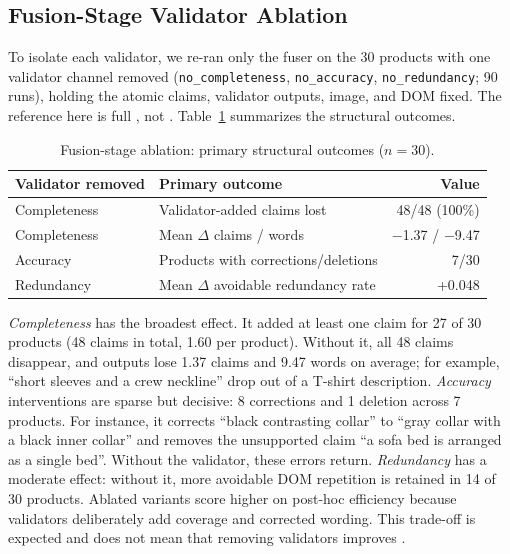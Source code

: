 \subsection{Fusion-Stage Validator Ablation}
To isolate each validator, we re-ran only the fuser on the 30 products with one validator channel removed (\texttt{no\_completeness}, \texttt{no\_accuracy}, \texttt{no\_redundancy}; 90 runs), holding the atomic claims, validator outputs, image, and DOM fixed. The reference here is full \sys, not \base. Table~\ref{tab:ablation} summarizes the structural outcomes.

\begin{table}[t]
\caption{Fusion-stage ablation: primary structural outcomes ($n=30$).}
\label{tab:ablation}
\centering
\footnotesize
\setlength{\tabcolsep}{3pt}
\begin{tabular}{@{}llr@{}}
\toprule
Validator removed & Primary outcome & Value \\
\midrule
Completeness & Validator-added claims lost & 48/48 (100\%) \\
Completeness & Mean $\Delta$ claims / words & $-$1.37 / $-$9.47 \\
Accuracy     & Products with corrections/deletions & 7/30 \\
Redundancy   & Mean $\Delta$ avoidable redundancy rate & +0.048 \\
\bottomrule
\end{tabular}
\end{table}

\textit{Completeness} has the broadest effect. It added at least one claim for 27 of 30 products (48 claims in total, 1.60 per product). Without it, all 48 claims disappear, and outputs lose 1.37 claims and 9.47 words on average; for example, ``short sleeves and a crew neckline'' drop out of a T-shirt description. \textit{Accuracy} interventions are sparse but decisive: 8 corrections and 1 deletion across 7 products. For instance, it corrects ``black contrasting collar'' to ``gray collar with a black inner collar'' and removes the unsupported claim ``a sofa bed is arranged as a single bed''. Without the validator, these errors return. \textit{Redundancy} has a moderate effect: without it, more avoidable DOM repetition is retained in 14 of 30 products. Ablated variants score higher on post-hoc efficiency because validators deliberately add coverage and corrected wording. This trade-off is expected and does not mean that removing validators improves \sys.
